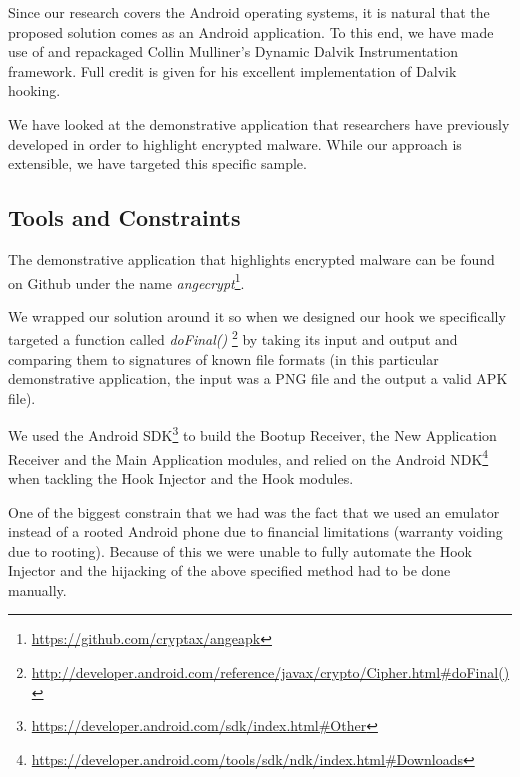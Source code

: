 
Since our research covers the Android operating systems, it is natural that
the proposed solution comes as an Android application. To this end, we have
made use of and repackaged Collin Mulliner's Dynamic Dalvik Instrumentation
framework. Full credit is given for his excellent implementation of Dalvik
hooking.

We have looked at the demonstrative application that researchers have
previously\cite{hiding-apk} developed in order to highlight encrypted malware.
While our approach is extensible, we have targeted this specific sample.

\subsection{Tools and Constraints}

The demonstrative application that highlights encrypted malware can be found 
on Github under the name
 \emph{angecrypt}\footnote{\url{https://github.com/cryptax/angeapk}}. 

We wrapped our solution around it so when we designed our hook we specifically 
targeted a function called \emph{doFinal()} \footnote{\url{ 
http://developer.android.com/reference/javax/crypto/Cipher.html\#doFinal()}}
by taking its input and output and comparing them to signatures of known 
file formats (in this particular demonstrative application, the input was a PNG
file and the output a valid APK file). 

We used the Android SDK\footnote{\url{https://developer.android.com/sdk/index.html\#Other}}
to build the Bootup Receiver, the New Application Receiver 
and the Main Application modules, and relied on the Android NDK\footnote{\url{https://developer.android.com/tools/sdk/ndk/index.html\#Downloads}}
when tackling the Hook Injector and the Hook modules.

One of the biggest constrain that we had was the fact that we used an 
emulator instead of a rooted Android phone due to financial limitations 
(warranty voiding due to rooting). Because of this we were unable to fully
 automate the Hook Injector and the hijacking of the above specified 
method had to be done manually.

